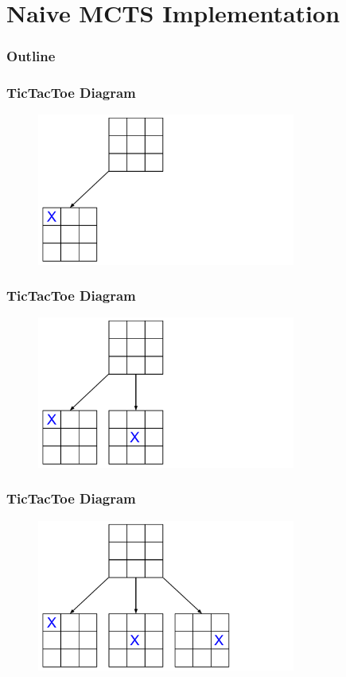 \documentclass{beamer}
\begin{document}
\section{Naive MCTS Implementation}

\begin{frame}
\frametitle{Outline}
\tableofcontents[currentsection]
\end{frame}

\begin{frame}[fragile]
\frametitle{TicTacToe Diagram}
\begin{figure}[h]
	\includegraphics[width=8.5cm]{Diagrams/TicTacToe/TicTacToeTreeOne.pdf}
	\centering
\end{figure}
\end{frame}

\begin{frame}[fragile]
\frametitle{TicTacToe Diagram}
\begin{figure}[h]
	\includegraphics[width=8.5cm]{Diagrams/TicTacToe/TicTacToeTreeTwo.pdf}
	\centering
\end{figure}
\end{frame}

\begin{frame}[fragile]
\frametitle{TicTacToe Diagram}
\begin{figure}[h]
	\includegraphics[width=8.5cm]{Diagrams/TicTacToe/TicTacToeTreeThree.pdf}
	\centering
\end{figure}
\end{frame}
\end{document}
